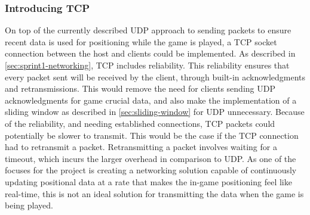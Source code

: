 \subsubsection{Introducing TCP}
On top of the currently described UDP approach to sending packets to ensure recent data is used for positioning while the game is played, a TCP socket connection between the host and clients could be implemented.
As described in \autoref{sec:sprint1-networking}, TCP includes reliability.
This reliability ensures that every packet sent will be received by the client, through built-in acknowledgments and retransmissions.
This would remove the need for clients sending UDP acknowledgments for game crucial data, and also make the implementation of a sliding window as described in \autoref{sec:sliding-window} for UDP unnecessary.
Because of the reliability, and needing established connections, TCP packets could potentially be slower to transmit.
This would be the case if the TCP connection had to retransmit a packet.
Retransmitting a packet involves waiting for a timeout, which incurs the larger overhead in comparison to UDP.
As one of the focuses for the project is creating a networking solution capable of continuously updating positional data at a rate that makes the in-game positioning feel like real-time, this is not an ideal solution for transmitting the data when the game is being played.
